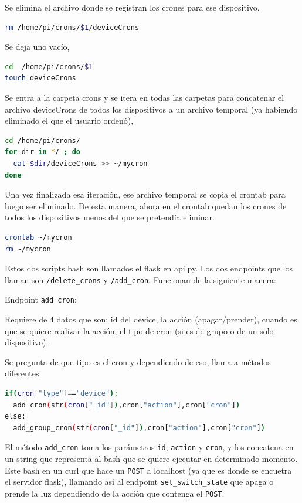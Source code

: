 Se elimina el archivo donde se registran los crones para ese dispositivo.
\begin{lstlisting}[language=bash]
rm /home/pi/crons/$1/deviceCrons
\end{lstlisting}

Se deja uno vacío,
\begin{lstlisting}[language=bash]
cd  /home/pi/crons/$1
touch deviceCrons
\end{lstlisting}

Se entra a la carpeta crons y se itera en todas las carpetas para concatenar  el archivo deviceCrons de todos los dispositivos a un archivo temporal (ya habiendo eliminado el que el usuario ordenó),

\begin{lstlisting}[language=bash]
cd /home/pi/crons/
for dir in */ ; do
  cat $dir/deviceCrons >> ~/mycron
done 
\end{lstlisting}

Una vez finalizada esa iteración,  ese archivo temporal se copia el crontab para luego ser eliminado. De esta manera, ahora en el crontab quedan los crones de todos los dispositivos menos del que se pretendía eliminar.

\begin{lstlisting}[language=bash]
crontab ~/mycron
rm ~/mycron
\end{lstlisting}

Estos dos scripts bash son llamados el flask en api.py. Los dos endpoints que los llaman son \lstinline[columns=fixed]{/delete_crons} y \lstinline[columns=fixed]{/add_cron}. Funcionan de la siguiente manera:

Endpoint \lstinline[columns=fixed]{add_cron}:

Requiere de 4 datos que son: id del device, la acción (apagar/prender), cuando es que se quiere realizar la acción, el tipo de cron (si es de grupo o de un solo dispositivo).

Se pregunta de que tipo es el cron y dependiendo de eso, llama a métodos diferentes:

\begin{lstlisting}[language=bash]
if(cron["type"]=="device"):
  add_cron(str(cron["_id"]),cron["action"],cron["cron"])
else:
  add_group_cron(str(cron["_id"]),cron["action"],cron["cron"])
\end{lstlisting}

El método \lstinline[columns=fixed]{add_cron} toma los parámetros \lstinline[columns=fixed]{id}, \lstinline[columns=fixed]{action} y \lstinline[columns=fixed]{cron}, y los concatena en un string que representa al bash que se quiere ejecutar en determinado momento. Este bash en un curl que hace un \lstinline[columns=fixed]{POST} a localhost (ya que es donde se encuetra el servidor flask), llamando así al endpoint \lstinline[columns=fixed]{set_switch_state} que apaga o prende la luz dependiendo de la acción que contenga el \lstinline[columns=fixed]{POST}.

